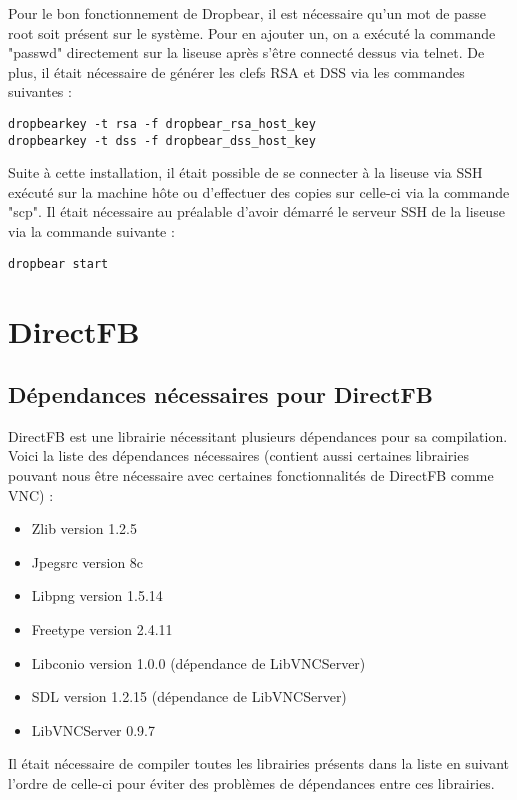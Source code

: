 Pour le bon fonctionnement de Dropbear, il est nécessaire qu'un mot de passe root soit présent sur le système. Pour en ajouter un, on a exécuté la commande "passwd" directement sur la liseuse après s'être connecté dessus via telnet.
De plus, il était nécessaire de générer les clefs RSA et DSS via les commandes suivantes :

\begin{lstlisting}
dropbearkey -t rsa -f dropbear_rsa_host_key
dropbearkey -t dss -f dropbear_dss_host_key
\end{lstlisting}

Suite à cette installation, il était possible de se connecter à la liseuse via SSH exécuté sur la machine hôte ou d'effectuer des copies sur celle-ci via la commande "scp". Il était nécessaire au préalable d'avoir démarré le serveur SSH de la liseuse via la commande suivante :

\begin{lstlisting}
dropbear start
\end{lstlisting}

\newpage


\section{DirectFB}

\subsection{Dépendances nécessaires pour DirectFB}

DirectFB est une librairie nécessitant plusieurs dépendances pour sa compilation. Voici la liste des dépendances nécessaires (contient aussi certaines librairies pouvant nous être nécessaire avec certaines fonctionnalités de DirectFB comme VNC) :

\begin{itemize}
\item Zlib version 1.2.5
\item Jpegsrc version 8c
\item Libpng version 1.5.14
\item Freetype version 2.4.11
\item Libconio version 1.0.0 (dépendance de LibVNCServer)
\item SDL version 1.2.15 (dépendance de LibVNCServer)
\item LibVNCServer 0.9.7
\end{itemize}

Il était nécessaire de compiler toutes les librairies présents dans la liste en suivant l'ordre de celle-ci pour éviter des problèmes de dépendances entre ces librairies.

